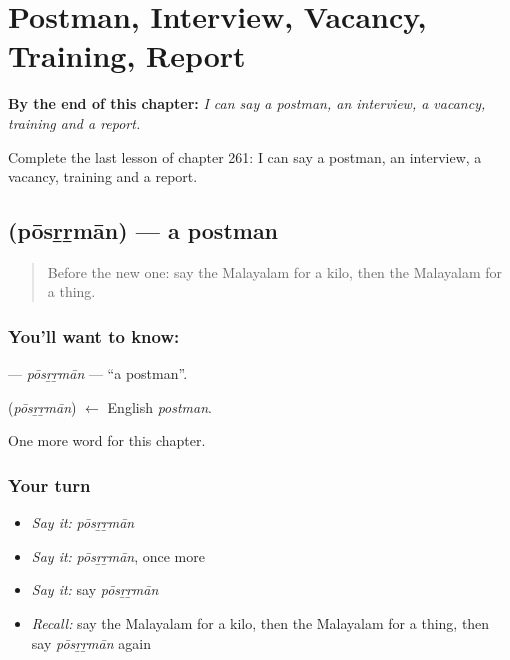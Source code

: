
\chapter{Postman, Interview, Vacancy, Training, Report}
\label{ch:ml-postman-interview-vacancy-training-report}

\begin{chapteropening}
\textbf{By the end of this chapter:} \emph{I can say a postman, an interview, a vacancy, training and a report.}

Complete the last lesson of chapter 261: I can say a postman, an interview, a vacancy, training and a report.
\end{chapteropening}

\section[\texorpdfstring{\ml{പോസ്റ്റ്മാൻ} (pōsṟṟmān)}{പോസ്റ്റ്മാൻ (pōsṟṟmān)}]{ (pōsṟṟmān) — a postman}

\label{lesson:ML-C261-posrrman}



\begin{quote}
Before the new one: say the Malayalam for a kilo, then the Malayalam for a thing.
\end{quote}

\subsection*{You'll want to know: }
\textbf{} — \emph{pōsṟṟmān} — \textquotedblleft{}a postman\textquotedblright{}.

\begin{cousinweb}
\textbf{} (\emph{pōsṟṟmān}) $\leftarrow$ English \emph{postman}.
\end{cousinweb}

\begin{grammarlens}[title={What you've built}]
One more word for this chapter.
\end{grammarlens}

\subsection*{Your turn}
\begin{itemize}
\raggedright
  \item \emph{Say it:} \emph{pōsṟṟmān}
  \item \emph{Say it:} \emph{pōsṟṟmān}, once more
  \item \emph{Say it:} say \emph{pōsṟṟmān}
  \item \emph{Recall:} say the Malayalam for a kilo, then the Malayalam for a thing, then say \emph{pōsṟṟmān} again
\end{itemize}


